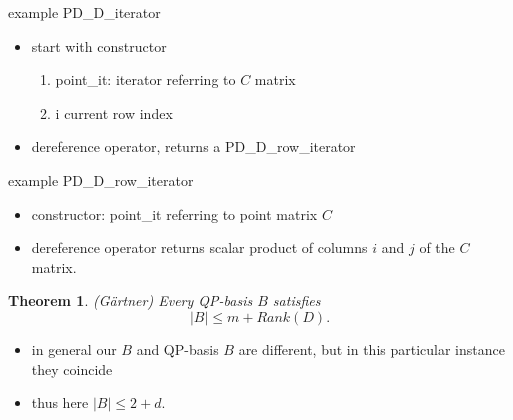 \documentclass{slides}
\newtheorem{theorem}{Theorem}
\begin{document}
\begin{slide}
example PD\_D\_iterator
\end{slide}

\begin{note}
\begin{itemize}
\item start with constructor
\begin{enumerate}
\item point\_it: iterator referring to $C$ matrix
\item i current row index
\end{enumerate}
\item dereference operator, returns a PD\_D\_row\_iterator
\end{itemize}
\end{note}

\begin{slide}
example PD\_D\_row\_iterator
\end{slide}

\begin{note}
\begin{itemize}
\item constructor: point\_it referring to point matrix $C$
\item dereference operator returns scalar product of columns $i$ and $j$ of the
$C$ matrix.
\end{itemize}
\end{note}

\begin{slide}
\begin{theorem}(G\"{a}rtner)
Every QP-basis $B$ satisfies
\[
\left|B\right| \leq m + Rank(D).
\]
\end{theorem}
\end{slide}

\begin{note}
\begin{itemize}
\item in general our $B$ and QP-basis $B$ are different, but in this particular
instance they coincide
\item thus here $\left|B\right| \leq 2 + d$.
\end{itemize}
\end{note}


\end{document}
